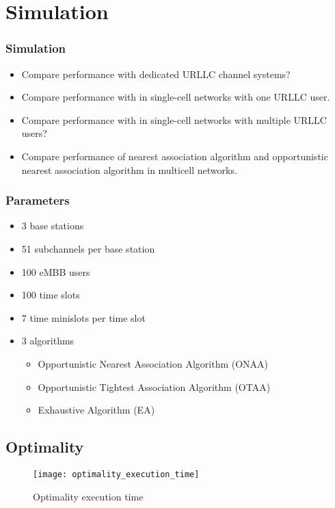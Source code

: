 \section{Simulation}
\begin{frame}
  \frametitle{Simulation}
  \begin{itemize}
    \item Compare performance with dedicated URLLC channel systems?
    \item Compare performance with \cite{AVS20} in single-cell networks with one URLLC user.
    \item Compare performance with \cite{YZR21} in single-cell networks with multiple URLLC users?
    \item Compare performance of nearest association algorithm and opportunistic nearest association algorithm in multicell networks.
  \end{itemize}
\end{frame}

\begin{frame}
  \frametitle{Parameters}
  \begin{itemize}
    \item 3 base stations
    \item 51 subchannels per base station
    \item 100 eMBB users
    \item 100 time slots
    \item 7 time minislots per time slot
    \item 3 algorithms
      \begin{itemize}
        \item Opportunistic Nearest Association Algorithm (ONAA)
        \item Opportunistic Tightest Association Algorithm (OTAA)
        \item Exhaustive Algorithm (EA)
      \end{itemize}
  \end{itemize}
\end{frame}

\subsection{Optimality}
\begin{frame}
  \begin{figure}
    \texttt{[image: optimality\_execution\_time]}
    \caption{Optimality execution time}
  \end{figure}
\end{frame}

